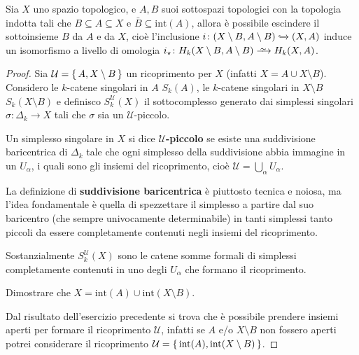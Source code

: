 \begin{theorem}
  Sia $ X $ uno spazio topologico, e $ A, B $ suoi sottospazi topologici
  con la topologia indotta tali che $ B \subseteq A \subseteq X $ e $ \bar{B} \subseteq \mathrm{int}(A) $,
  allora è possibile escindere il sottoinsieme $ B $ da $ A $ e da $ X $, cioè
  l'inclusione $ i \colon (X \setminus B, A \setminus B) \xhookrightarrow{} (X,A) $ induce un isomorfismo a livello
  di omologia $ i_\star \colon H_k(X \setminus B, A \setminus B) \homoto H_k(X,A) $.
\end{theorem}
\begin{proof}
  Sia $ \mathcal{U} = \set{A, X \setminus B} $ un ricoprimento per $ X $ (infatti
  $ X = A \cup X \setminus B $). Considero le $ k $-catene singolari in $ A $ $ S_k(A) $,
  le $ k $-catene singolari in $ X \setminus B $ $ S_k(X \setminus B) $ e definisco
  $ S_k^\mathcal{U}(X) $ il sottocomplesso generato dai simplessi singolari
  $ \sigma \colon \Delta_k \to X $ tali che $ \sigma $ sia un $ \mathcal{U} $-piccolo.

  \begin{definition}
    Un simplesso singolare in $ X $ si dice
    \textbf{$ \mathcal{U} $-piccolo} se esiste
    una suddivisione baricentrica di $ \Delta_k $ tale che ogni simplesso della
    suddivisione abbia immagine in un $ U_\alpha $, i quali sono gli insiemi del
    ricoprimento, cioè $ \mathcal{U} = \bigcup_\alpha U_\alpha $.
  \end{definition}

  \begin{definition}
    La definizione di \textbf{suddivisione baricentrica} è piuttosto tecnica e noiosa, ma l'idea fondamentale è
    quella di spezzettare il simplesso a partire dal suo baricentro (che sempre
    univocamente determinabile) in tanti simplessi tanto piccoli da essere
    completamente contenuti negli insiemi del ricoprimento.
  \end{definition}
  Sostanzialmente $ S_k^\mathcal{U}(X) $ sono le catene somme formali di simplessi
  completamente contenuti in uno degli $ U_\alpha $ che formano il ricoprimento.
  \begin{exercise}
    Dimostrare che $ X = \mathrm{int}(A) \cup \mathrm{int}(X \setminus B) $.
  \end{exercise}
  Dal risultato dell'esercizio precedente si trova che è possibile prendere
  insiemi aperti per formare il ricoprimento $ \mathcal{U} $, infatti se $ A $
  e/o $ X \setminus B $ non fossero aperti potrei considerare il ricoprimento
  $ \mathcal{U} = \set{ \mathrm{int}(A), \mathrm{int}(X \setminus B)} $.


\end{proof}
